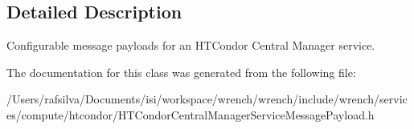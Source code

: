 \subsection{Detailed Description}
Configurable message payloads for an H\+T\+Condor Central Manager service. 

The documentation for this class was generated from the following file\+:\begin{DoxyCompactItemize}
\item 
/\+Users/rafsilva/\+Documents/isi/workspace/wrench/wrench/include/wrench/services/compute/htcondor/H\+T\+Condor\+Central\+Manager\+Service\+Message\+Payload.\+h\end{DoxyCompactItemize}

